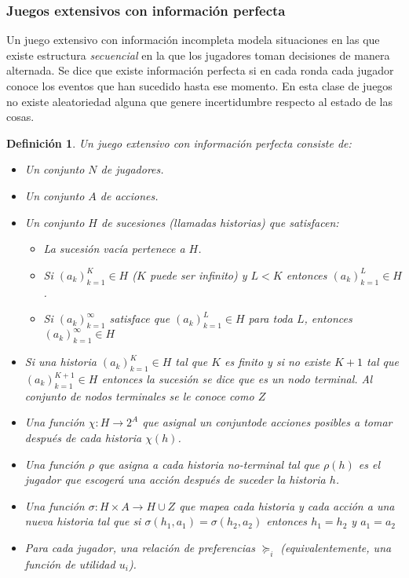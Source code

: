 \documentclass[11pt]{article}
\theoremstyle{plain}
\newtheorem{defi}[teo]{Definición}
\begin{document}
\subsubsection{Juegos extensivos con información perfecta}
Un juego extensivo con información incompleta modela situaciones en las que existe estructura \textit{secuencial} en la que los jugadores toman decisiones de manera alternada. Se dice que existe información perfecta si en cada ronda cada jugador conoce los eventos que han sucedido hasta ese momento. En esta clase de juegos no existe aleatoriedad alguna que genere incertidumbre respecto al estado de las cosas.
\begin{defi}
Un juego extensivo con información perfecta consiste de:
\begin{itemize}
\item Un conjunto  $N$ de jugadores.
\item Un conjunto $A$ de acciones.
\item Un conjunto $H$ de sucesiones (llamadas historias) que satisfacen:
	\begin{itemize}
		\item La sucesión vacía pertenece a $H$.
		\item Si $(a_k)_{k=1}^K \in H$ ($K$ puede ser infinito) y $L < K$ entonces $(a_k)_{k=1}^L \in H$.
		\item Si $(a_k)_{k=1}^\infty$ satisface que $(a_k)_{k=1}^L \in H$ para toda $L$, entonces $(a_k)_{k=1}^\infty \in H$
	\end{itemize}
\item Si una historia $(a_k)_{k=1}^K \in H$ tal que $K$ es finito y si no existe $K+1$ tal que $(a_k)_{k=1}^{K+1} \in H$ entonces la sucesión se dice que es un nodo terminal. Al conjunto de nodos terminales se le conoce como $Z$
\item Una función $\chi : H \to 2^A$ que asignal un conjuntode acciones posibles a tomar después de cada historia $\chi(h)$.
\item Una función $\rho$ que asigna a cada historia no-terminal tal que $\rho(h)$ es el jugador que escogerá una acción después de suceder la historia $h$.
\item Una función $\sigma : H \times A \to H \cup Z$ que mapea cada historia y cada acción a una nueva historia tal que si $\sigma(h_1 , a_1) = \sigma (h_2,a_2)$ entonces $h_1 = h_2$ y $a_1 = a_2$
\item Para cada jugador, una relación de preferencias $\succeq_i$ (equivalentemente, una función de utilidad $u_i$).
\end{itemize}
\end{defi}
\end{document}
